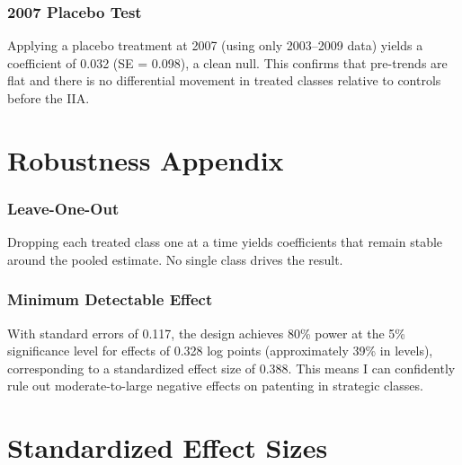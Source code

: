\documentclass[12pt]{article}
\begin{document}
\subsubsection*{2007 Placebo Test} Applying a placebo treatment at 2007 (using only 2003--2009 data) yields a coefficient of 0.032 (SE = 0.098), a clean null. This confirms that pre-trends are flat and there is no differential movement in treated classes relative to controls before the IIA.

\section{Robustness Appendix}

\subsubsection*{Leave-One-Out} Dropping each treated class one at a time yields coefficients that remain stable around the pooled estimate. No single class drives the result.

\subsubsection*{Minimum Detectable Effect} With standard errors of 0.117, the design achieves 80\% power at the 5\% significance level for effects of 0.328 log points (approximately 39\% in levels), corresponding to a standardized effect size of 0.388. This means I can confidently rule out moderate-to-large negative effects on patenting in strategic classes.

\section{Standardized Effect Sizes}
\label{sec:sde}


\end{document}
